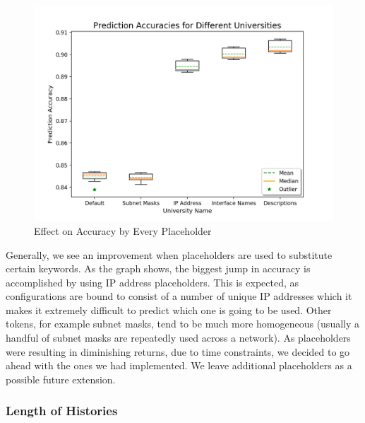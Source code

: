 \begin{figure}[H]
	\centering
	\includegraphics[width=\textwidth]{placeholders.png}
	\caption{Effect on Accuracy by Every Placeholder}
\end{figure}

Generally, we see an improvement when placeholders are used to substitute certain keywords. As the graph shows, the biggest jump in accuracy is accomplished by using IP address placeholders. This is expected, as configurations are bound to consist of a number of unique IP addresses which it makes it extremely difficult to predict which one is going to be used. Other tokens, for example subnet masks, tend to be much more homogeneous (usually a handful of subnet masks are repeatedly used across a network). As placeholders were resulting in diminishing returns, due to time constraints, we decided to go ahead with the ones we had implemented. We leave additional placeholders as a possible future extension.


\subsubsection{Length of Histories}

